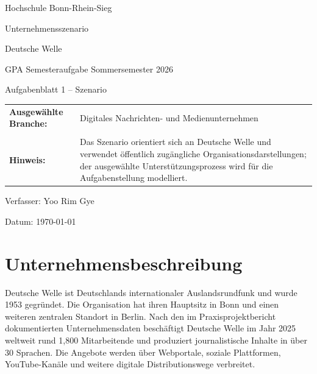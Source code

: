 \documentclass[11pt,a4paper]{article}
\newcommand{\companyname}{Deutsche Welle}
\begin{document}

\begin{titlepage}
  \centering
  \vspace*{2cm}
  {\Large Hochschule Bonn-Rhein-Sieg\par}
  \vspace{1.2cm}
  {\huge Unternehmensszenario\par}
  \vspace{0.4cm}
  {\LARGE \companyname\par}
  \vspace{1.5cm}
  {\large GPA Semesteraufgabe Sommersemester 2026\par}
  \vspace{0.3cm}
  {\large Aufgabenblatt 1 -- Szenario\par}
  \vfill
  \begin{tabular}{>{\bfseries}p{4cm}p{8cm}}
    Ausgew\"ahlte Branche: & Digitales Nachrichten- und Medienunternehmen \\
    \\
    Hinweis: & Das Szenario orientiert sich an \companyname{} und verwendet öffentlich zugängliche Organisationsdarstellungen; der ausgewählte Unterstützungsprozess wird für die Aufgabenstellung modelliert. \\
  \end{tabular}
  \vfill
  {\large Verfasser: Yoo Rim Gye{\hspace{7cm}}\par}
  \vspace{0.5cm}
  {\large Datum: \today\par}
\end{titlepage}

\clearpage
{}
\tableofcontents
\newpage

\section{Unternehmensbeschreibung}
\companyname{} ist Deutschlands internationaler Auslandsrundfunk und wurde 1953 gegr\"undet.
Die Organisation hat ihren Hauptsitz in Bonn und einen weiteren zentralen Standort in Berlin.
Nach den im Praxisprojektbericht dokumentierten Unternehmensdaten besch\"aftigt \companyname{}
im Jahr 2025 weltweit rund 1{,}800 Mitarbeitende und produziert journalistische Inhalte in \"uber
30 Sprachen. Die Angebote werden \"uber Webportale, soziale Plattformen,
YouTube-Kan\"ale und weitere digitale Distributionswege verbreitet.
\end{document}
